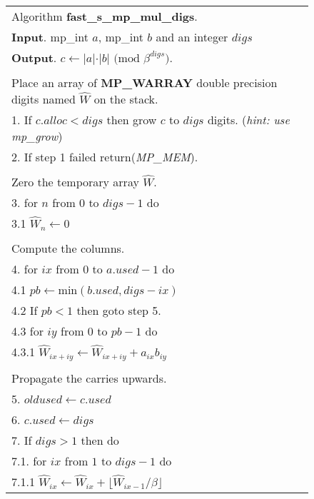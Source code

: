 \documentclass[b5paper]{book}
\begin{document}
\newpage\begin{figure}[!here]
\begin{small}
\begin{center}
\begin{tabular}{l}
\hline Algorithm \textbf{fast\_s\_mp\_mul\_digs}. \\
\textbf{Input}.   mp\_int $a$, mp\_int $b$ and an integer $digs$ \\
\textbf{Output}.  $c \leftarrow \vert a \vert \cdot \vert b \vert \mbox{ (mod }\beta^{digs}\mbox{)}$. \\
\hline \\
Place an array of \textbf{MP\_WARRAY} double precision digits named $\hat W$ on the stack. \\
1.  If $c.alloc < digs$ then grow $c$ to $digs$ digits. (\textit{hint: use mp\_grow}) \\
2.  If step 1 failed return(\textit{MP\_MEM}).\\
\\
Zero the temporary array $\hat W$. \\
3.  for $n$ from $0$ to $digs - 1$ do \\
\hspace{3mm}3.1  $\hat W_n \leftarrow 0$ \\
\\
Compute the columns. \\
4.  for $ix$ from $0$ to $a.used - 1$ do \\
\hspace{3mm}4.1  $pb \leftarrow \mbox{min}(b.used, digs - ix)$ \\
\hspace{3mm}4.2  If $pb < 1$ then goto step 5. \\
\hspace{3mm}4.3  for $iy$ from $0$ to $pb - 1$ do \\
\hspace{6mm}4.3.1  $\hat W_{ix+iy} \leftarrow \hat W_{ix+iy} + a_{ix}b_{iy}$ \\
\\
Propagate the carries upwards. \\
5.  $oldused \leftarrow c.used$ \\
6.  $c.used \leftarrow digs$ \\
7.  If $digs > 1$ then do \\
\hspace{3mm}7.1.  for $ix$ from $1$ to $digs - 1$ do \\
\hspace{6mm}7.1.1  $\hat W_{ix} \leftarrow \hat W_{ix} + \lfloor \hat W_{ix-1} / \beta \rfloor$ \\

\end{tabular}
\end{center}
\end{small}
\end{figure}
\end{document}
